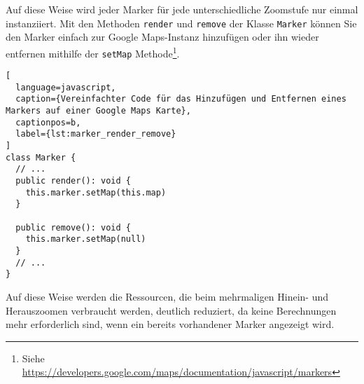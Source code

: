 Auf diese Weise wird jeder Marker für jede unterschiedliche Zoomstufe nur einmal instanziiert.
Mit den Methoden \lstinline{render} und \lstinline{remove} der Klasse \lstinline{Marker} können Sie den Marker einfach zur Google Maps-Instanz hinzufügen oder ihn wieder entfernen mithilfe der \lstinline{setMap} Methode\footnote{Siehe \href{https://developers.google.com/maps/documentation/javascript/markers}{https://developers.google.com/maps/documentation/javascript/markers}}.

\begin{lstlisting}[
  language=javascript,
  caption={Vereinfachter Code für das Hinzufügen und Entfernen eines Markers auf einer Google Maps Karte},
  captionpos=b,
  label={lst:marker_render_remove}
]
class Marker {
  // ...
  public render(): void {
    this.marker.setMap(this.map)
  }

  public remove(): void {
    this.marker.setMap(null)
  }
  // ...
}
\end{lstlisting}

Auf diese Weise werden die Ressourcen, die beim mehrmaligen Hinein- und Herauszoomen verbraucht werden, deutlich reduziert, da keine Berechnungen mehr erforderlich sind, wenn ein bereits vorhandener Marker angezeigt wird.
